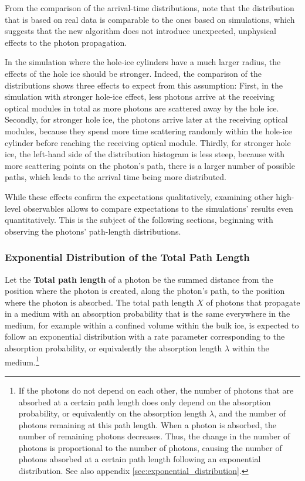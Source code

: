 From the comparison of the arrival-time distributions, note that the distribution that is based on real data is comparable to the ones based on simulations, which suggests that the new algorithm does not introduce unexpected, unphysical effects to the photon propagation.


In the simulation where the hole-ice cylinders have a much larger radius, the effects of the hole ice should be stronger. Indeed, the comparison of the distributions shows three effects to expect from this assumption:
First, in the simulation with stronger hole-ice effect, less photons arrive at the receiving optical modules in total as more photons are scattered away by the hole ice.
Secondly, for stronger hole ice, the photons arrive later at the receiving optical modules, because they spend more time scattering randomly within the hole-ice cylinder before reaching the receiving optical module.
Thirdly, for stronger hole ice, the left-hand side of the distribution histogram is less steep, because with more scattering points on the photon's path, there is a larger number of possible paths, which leads to the arrival time being more distributed.

While these effects confirm the expectations qualitatively, examining other high-level observables allows to compare expectations to the simulations' results even quantitatively. This is the subject of the following sections, beginning with observing the photons' path-length distributions.

\FloatBarrier\newpage
\subsubsection{Exponential Distribution of the Total Path Length}
\label{sec:total_path_length_distribution}


Let the \textbf{Total path length} of a photon be the summed distance from the position where the photon is created, along the photon's path, to the position where the photon is absorbed.
The total path length $X$ of photons that propagate in a medium with an absorption probability that is the same everywhere in the medium, for example within a confined volume within the bulk ice, is expected to follow an exponential distribution with a rate parameter corresponding to the absorption probability, or equivalently the absorption length $\lambda$ within the medium.\footnote{If the photons do not depend on each other, the number of photons that are absorbed at a certain path length does only depend on the absorption probability, or equivalently on the absorption length $\lambda$, and the number of photons remaining at this path length. When a photon is absorbed, the number of remaining photons decreases. Thus, the change in the number of photons is proportional to the number of photons, causing the number of photons absorbed at a certain path length following an exponential distribution. See also appendix \ref{sec:exponential_distribution}.}

